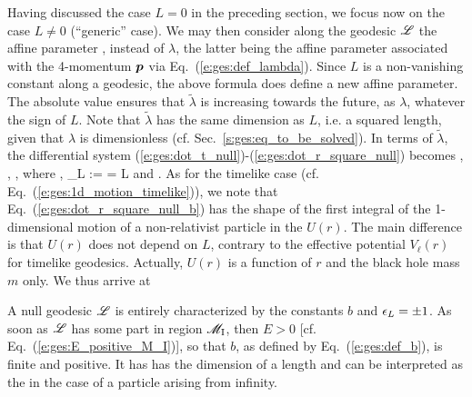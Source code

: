 Having discussed the case $L=0$ in the preceding section, we focus now on the
case $L\not= 0$ (``generic'' case). We may then
consider along the geodesic $\mathscr{L}$ the affine parameter
\be
   ,
\ee
instead of $\lambda$, the latter being the affine parameter associated with the 4-momentum $\bm{p}$
via Eq.~(\ref{e:ges:def_lambda}).
Since $L$ is a non-vanishing constant along a geodesic, the above formula
does define a new affine parameter. The absolute value ensures that
$\tilde{\lambda}$ is increasing towards the future, as $\lambda$, whatever
the sign of $L$. Note that $\tilde{\lambda}$ has the same
dimension as $L$, i.e. a squared length, given that $\lambda$ is dimensionless
(cf. Sec.~\ref{s:ges:eq_to_be_solved}).
In terms of $\tilde{\lambda}$,
the differential system (\ref{e:ges:dot_t_null})-(\ref{e:ges:dot_r_square_null})
becomes
\be \label{e:ges:dot_t_null_b}
   ,
\ee
\be \label{e:ges:dot_ph_null_b}
    ,
\ee
\be \label{e:ges:dot_r_square_null_b}
   ,
\ee
where
\be \label{e:ges:def_b}
     ,
\ee
\be \label{e:gis:def_epsilon_L}
    \eps_L :=  =  L
\ee
and
\be \label{e:ges:eff_pot_null}
    .
\ee
As for the timelike case (cf. Eq.~(\ref{e:ges:1d_motion_timelike})),
we note that Eq.~(\ref{e:ges:dot_r_square_null_b})
has the shape of the first integral of the
1-dimensional motion of a non-relativist particle in the
$U(r)$. The main difference is that $U(r)$ does not depend on $L$, contrary
to the effective potential $V_\ell(r)$ for timelike geodesics. Actually,
$U(r)$ is a function of $r$ and the black hole mass $m$ only.
We thus arrive at
\begin{greybox}
A null geodesic $\mathscr{L}$ is entirely characterized by the constants
$b$ and $\epsilon_L = \pm 1$.
As soon as $\mathscr{L}$ has some part in
region $\mathscr{M}_{\rm I}$, then $E>0$ [cf. Eq.~(\ref{e:ges:E_positive_M_I})], so that
$b$, as defined by Eq.~(\ref{e:ges:def_b}), is finite and positive. It has
has the dimension of a length
and can be interpreted as the
 in the case of a
particle arising from infinity.
\end{greybox}
